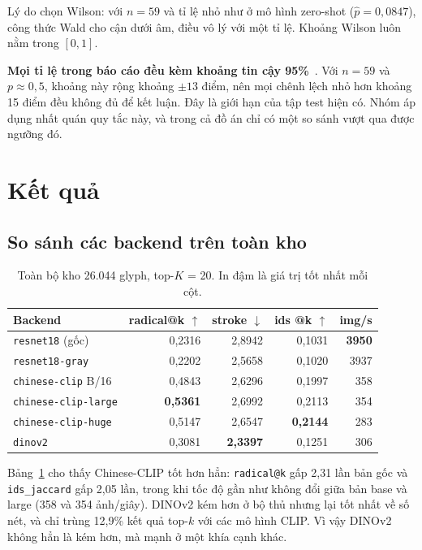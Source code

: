 \documentclass[conference,a4paper]{IEEEtran}
\newcommand{\code}[1]{{\small\texttt{#1}}}
\begin{document}
Lý do chọn Wilson: với $n = 59$ và tỉ lệ nhỏ như ở mô hình zero-shot ($\hat{p} = 0{,}0847$), công
thức Wald cho cận dưới âm, điều vô lý với một tỉ lệ. Khoảng Wilson luôn nằm trong $[0,1]$.

\textbf{Mọi tỉ lệ trong báo cáo đều kèm khoảng tin cậy 95\%}~\cite{wilson}. Với $n = 59$ và
$p \approx 0{,}5$, khoảng này rộng khoảng $\pm13$ điểm, nên mọi chênh lệch nhỏ hơn khoảng 15 điểm đều
không đủ để kết luận. Đây là giới hạn của tập test hiện có. Nhóm áp dụng nhất quán quy tắc này, và
trong cả đồ án chỉ có một so sánh vượt qua được ngưỡng đó.

\section{Kết quả}

\subsection{So sánh các backend trên toàn kho}

\begin{table}[t]
\caption{Toàn bộ kho 26.044 glyph, top-$K$ = 20. In đậm là giá trị tốt nhất mỗi cột.}
\label{tab:backend}
\centering\footnotesize
\begin{tabular}{@{}lrrrr@{}}
\toprule
Backend & radical@k $\uparrow$ & stroke $\downarrow$ & ids @k $\uparrow$ & img/s \\
\midrule
\code{resnet18} (gốc)      & 0,2316 & 2,8942 & 0,1031 & \textbf{3950} \\
\code{resnet18-gray}       & 0,2202 & 2,5658 & 0,1020 & 3937 \\
\code{chinese-clip} B/16   & 0,4843 & 2,6296 & 0,1997 & 358 \\
\code{chinese-clip-large}  & \textbf{0,5361} & 2,6992 & 0,2113 & 354 \\
\code{chinese-clip-huge}   & 0,5147 & 2,6547 & \textbf{0,2144} & 283 \\
\code{dinov2}              & 0,3081 & \textbf{2,3397} & 0,1251 & 306 \\
\bottomrule
\end{tabular}
\end{table}

Bảng~\ref{tab:backend} cho thấy Chinese-CLIP tốt hơn hẳn: \code{radical@k} gấp 2,31 lần bản gốc và
\code{ids\_jaccard} gấp 2,05 lần, trong khi tốc độ gần như không đổi giữa bản base và large (358 và
354 ảnh/giây). DINOv2 kém hơn ở bộ thủ nhưng lại tốt nhất về số nét, và chỉ trùng 12,9\% kết quả
top-$k$ với các mô hình CLIP. Vì vậy DINOv2 không hẳn là kém hơn, mà mạnh ở một khía cạnh khác.
\end{document}
